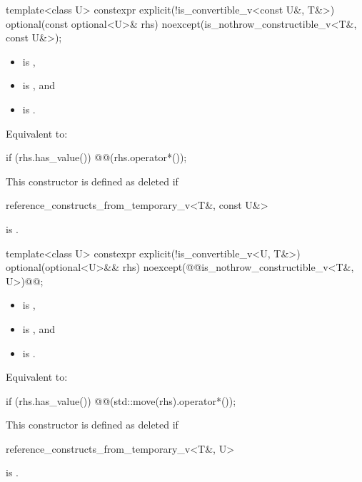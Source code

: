 %
\begin{itemdecl}
template<class U>
  constexpr explicit(!is_convertible_v<const U&, T&>)
      optional(const optional<U>& rhs) noexcept(is_nothrow_constructible_v<T&, const U&>);
\end{itemdecl}

\begin{itemdescr}
\pnum
\constraints
\begin{itemize}
\item {} is ,
\item {} is , and
\item {} is .
\end{itemize}

\pnum
\effects
Equivalent to:
\begin{codeblock}
if (rhs.has_value()) @@(rhs.operator*());
\end{codeblock}

\pnum
\remarks
This constructor is defined as deleted if
\begin{codeblock}
reference_constructs_from_temporary_v<T&, const U&>
\end{codeblock}
is .
\end{itemdescr}

%
\begin{itemdecl}
template<class U>
  constexpr explicit(!is_convertible_v<U, T&>)
      optional(optional<U>&& rhs) noexcept(@@is_nothrow_constructible_v<T&, U>)@\added{)}@;
\end{itemdecl}

\begin{itemdescr}
\pnum
\constraints
\begin{itemize}
\item {} is ,
\item {} is , and
\item {} is .
\end{itemize}

\pnum
\effects
Equivalent to:
\begin{codeblock}
if (rhs.has_value()) @@(std::move(rhs).operator*());
\end{codeblock}

\pnum
\remarks
This constructor is defined as deleted if
\begin{codeblock}
reference_constructs_from_temporary_v<T&, U>
\end{codeblock}
is .
\end{itemdescr}

